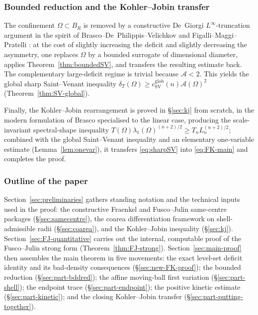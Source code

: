 \documentclass[11pt]{amsart}
\theoremstyle{definition}
\newcommand{\Om}{\Omega}
\newcommand{\Fr}{\mathcal A}
\newcommand{\dT}{\delta_T}
\begin{document}
\subsubsection*{Bounded reduction and the Kohler--Jobin transfer}

The confinement \(\Om\subset B_R\) is removed by a constructive De~Giorgi
\(L^\infty\)-truncation argument in the spirit of
Brasco--De~Philippis--Velichkov \cite[\S5]{BDV} and Figalli--Maggi--Pratelli
\cite{FMP2010}: at the cost of slightly increasing the deficit and
slightly decreasing the asymmetry, one replaces \(\Om\) by a bounded
surrogate of dimensional diameter, applies
Theorem~\ref{thm:boundedSV}, and transfers the resulting estimate back.
The complementary large-deficit regime is trivial because \(\Fr<2\).
This yields the global sharp Saint--Venant inequality
\(\dT(\Om)\ge c_{\mathrm{SV}}^{\mathrm{glob}}(n)\Fr(\Om)^2\)
(Theorem~\ref{thm:SV-global}).

Finally, the Kohler--Jobin rearrangement is proved in \S\ref{sec:kj} from
scratch, in the modern formulation of Brasco \cite{Brasco2014}
specialised to the linear case, producing the scale-invariant
spectral-shape inequality
\(T(\Om)\lambda_1(\Om)^{(n+2)/2}\ge T_n L_n^{(n+2)/2}\);
combined with the global Saint--Venant inequality and an elementary
one-variable estimate (Lemma~\ref{lem:onevar}), it transfers
\eqref{eq:sharpSV} into \eqref{eq:FK-main} and completes the proof.

\subsubsection*{Outline of the paper}

Section~\ref{sec:preliminaries} gathers standing notation and the technical
inputs used in the proof: the constructive Fraenkel and Fusco--Julin
same-centre packages (\S\ref{sec:samecentre}), the coarea differentiation
framework on shell-admissible radii (\S\ref{sec:coarea}), and the
Kohler--Jobin inequality (\S\ref{sec:kj}).
Section~\ref{sec:FJ-quantitative} carries out the internal, computable
proof of the Fusco--Julin strong form (Theorem~\ref{thm:FJ-strong}).
Section~\ref{sec:main-proof} then assembles the main theorem in five
movements: the exact level-set deficit identity and its bad-density
consequences (\S\ref{sec:new-FK-proof}); the bounded reduction
(\S\ref{sec:part-bddred}); the affine moving-ball first variation
(\S\ref{sec:part-shell}); the endpoint trace (\S\ref{sec:part-endpoint});
the positive kinetic estimate (\S\ref{sec:part-kinetic}); and the closing
Kohler--Jobin transfer (\S\ref{sec:part-putting-together}).
\end{document}
